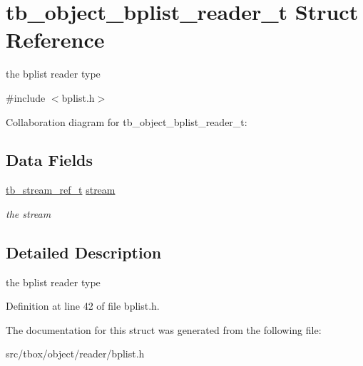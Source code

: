 \hypertarget{structtb__object__bplist__reader__t}{\section{tb\-\_\-object\-\_\-bplist\-\_\-reader\-\_\-t Struct Reference}
\label{structtb__object__bplist__reader__t}
}


the bplist reader type  




{\ttfamily \#include $<$bplist.\-h$>$}



Collaboration diagram for tb\-\_\-object\-\_\-bplist\-\_\-reader\-\_\-t\-:
\subsection*{Data Fields}
\begin{DoxyCompactItemize}
\item 
\hypertarget{structtb__object__bplist__reader__t_a6692ce826f9e41212745710767b2aaef}{\hyperlink{structtb__stream__ref__t}{tb\-\_\-stream\-\_\-ref\-\_\-t} \hyperlink{structtb__object__bplist__reader__t_a6692ce826f9e41212745710767b2aaef}{stream}}\label{structtb__object__bplist__reader__t_a6692ce826f9e41212745710767b2aaef}

\begin{DoxyCompactList}\small\item\em the stream \end{DoxyCompactList}\end{DoxyCompactItemize}


\subsection{Detailed Description}
the bplist reader type 

Definition at line 42 of file bplist.\-h.



The documentation for this struct was generated from the following file\-:\begin{DoxyCompactItemize}
\item 
src/tbox/object/reader/bplist.\-h\end{DoxyCompactItemize}
